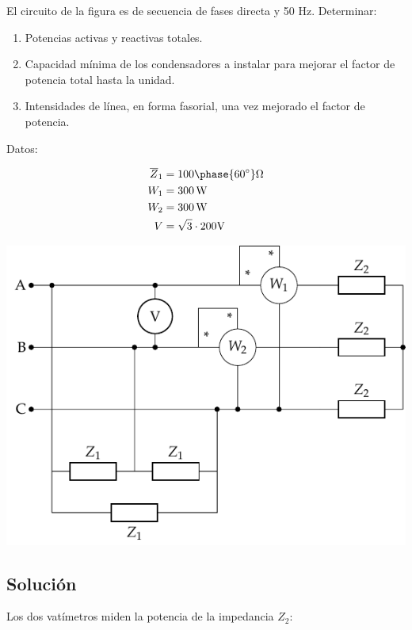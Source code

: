 El circuito de la figura es de secuencia de fases directa y 50 Hz. Determinar:
\begin{enumerate}
\item Potencias activas y reactivas totales.
\item Capacidad mínima de los condensadores a instalar para mejorar el factor de potencia total hasta la unidad.
\item Intensidades de línea, en forma fasorial, una vez mejorado el factor de potencia.
\end{enumerate}
\begin{minipage}{0.4\linewidth}
  Datos: 

  \begin{align*}
    \overline{Z}_1 &= {100\phase{\ang{60}}}\unit{\ohm}\\
    W_1 &= \SI{300}{\watt}\\
    W_2 &= \SI{300}{\watt}\\
    V &= {\sqrt{3} \cdot 200}\unit{\volt}
  \end{align*}
\end{minipage}
\begin{minipage}{0.6\linewidth}
  \begin{center}
    \includegraphics{figuras/ZyZt}
  \end{center}
\end{minipage}

\subsection*{Solución}

Los dos vatímetros miden la potencia de la impedancia $Z_2$:

